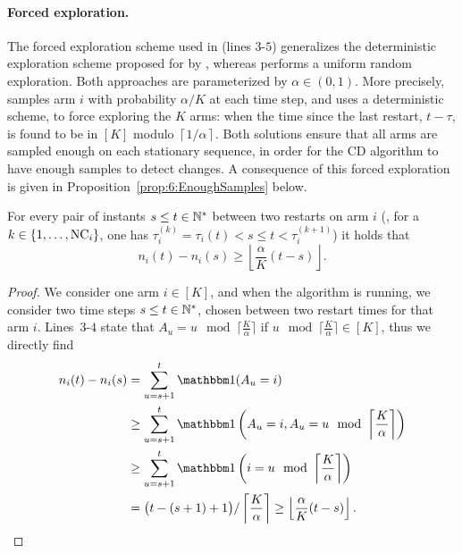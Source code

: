 \paragraph{Forced exploration.}

The forced exploration scheme used in \GLRklUCB{} (lines $3$-$5$) generalizes the deterministic exploration scheme proposed for \MUCB{} by \cite{CaoZhenKvetonXie18}, whereas \CUSUMUCB{} performs a uniform random exploration.
Both approaches are parameterized by $\alpha\in(0,1)$.
More precisely, \CUSUMUCB{} samples arm $i$ with probability $\alpha/K$ at each time step,
and \MUCB{} uses a deterministic scheme, to force exploring the $K$ arms: when the time since the last restart, $t - \tau$, is found to be in $[K]$ modulo $\left\lceil 1/\alpha \right\rceil$.
Both solutions ensure that all arms are sampled enough on each stationary sequence, in order for the CD algorithm to have enough \iid{} samples to detect changes.
%
A consequence of this forced exploration is given in Proposition~\ref{prop:6:EnoughSamples} below.

\begin{proposition}\label{prop:6:EnoughSamples}
    For every pair of instants $s \leq t\in\mathbb{N}^*$ between two restarts on arm $i$ (\ie, for a $k\in\{1,\dots,\text{NC}_i\}$, one has $\tau_i^{(k)} = \tau_i(t) < s \leq t < \tau_i^{(k+1)}$) it holds that
    \begin{equation}
        n_i(t) - n_i(s) \geq \left\lfloor \frac{\alpha}{K} (t-s) \right\rfloor.
    \end{equation}
\end{proposition}

\begin{proof}
    We consider one arm $i\in[K]$, and when the \GLRklUCB{} algorithm is running,
    we consider two time steps $s\leq t\in\mathbb{N}^*$, chosen between two restart times for that arm $i$.
    Lines~$3$-$4$ state that $A_u = u \mod \lceil \frac{K}{\alpha} \rceil$
    if $u \mod \lceil \frac{K}{\alpha} \rceil \in [K]$,
    thus we directly find
    \begin{align*}
        n_i(t) - n_i(s)
        & = \sum_{u=s+1}^{t} \indic(A_u = i) \\
        & \geq \sum_{u=s+1}^{t} \indic\left(A_u = i, A_u = u \mod \left\lceil \frac{K}{\alpha} \right\rceil\right) \\
        & \geq \sum_{u=s+1}^{t} \indic\left(i = u \mod \left\lceil \frac{K}{\alpha} \right\rceil\right) \\
        & = \bigl(t - (s+1) + 1\bigr) / \left\lceil \frac{K}{\alpha} \right\rceil
        \geq \left\lfloor \frac{\alpha}{K} (t - s) \right\rfloor.
    \end{align*}
\end{proof}


